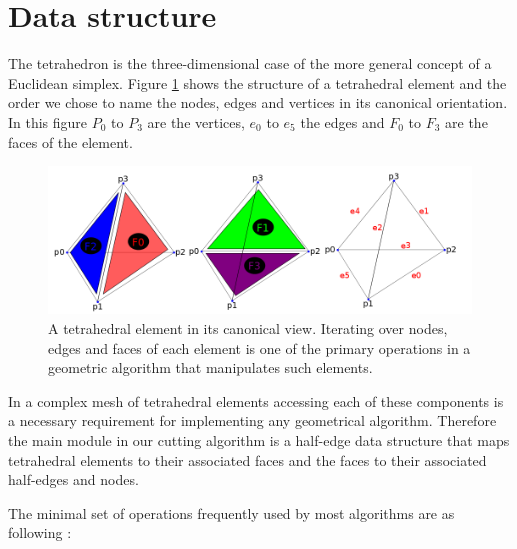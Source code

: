 \section{Data structure}
The tetrahedron is the three-dimensional case of the more general concept of a Euclidean simplex. 
Figure \ref{fig:tetconfig3} shows the structure of a tetrahedral element and the order we chose to 
name the nodes, edges and vertices in its canonical orientation. In this figure $P_0$ to $P_3$ are
the vertices, $e_0$ to $e_5$ the edges and $F_0$ to $F_3$ are the faces of the element.

\begin{figure}[H]
  \centering
  \includegraphics[width=1.0\linewidth]{figures/cutting/tetconfig3.png}
  \caption{\label{fig:tetconfig3}
  {A tetrahedral element in its canonical view. Iterating over nodes, edges and faces of each element is
  one of the primary operations in a geometric algorithm that manipulates such elements.}
}
\end{figure}


In a complex mesh of tetrahedral elements accessing each of these components is a necessary requirement for 
implementing any geometrical algorithm. Therefore the main module in our cutting algorithm is a half-edge 
data structure that maps tetrahedral elements to their associated faces and the faces to their associated half-edges and nodes. 

The minimal set of operations frequently used by most algorithms are as following \cite{Mario2010PolygonMesh}:

